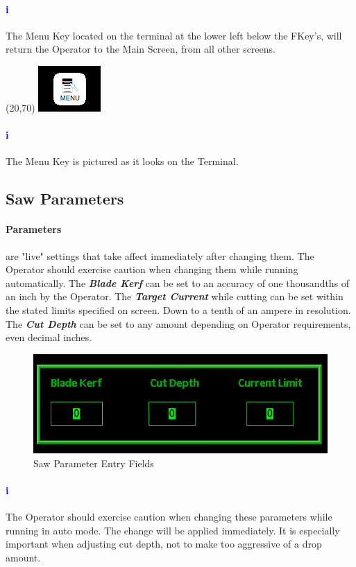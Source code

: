 \paragraph{\textbf{\LARGE \textcolor{blue}{i}}}
The Menu Key located on the terminal at the lower left below the FKey's, will return the Operator to the Main Screen, from all other screens.\\
\begin{minipage}{4cm}
	\begin{picture}(20,70)
		\includegraphics[width=.5\linewidth]{screen-captures/menu}
	\end{picture}
\end{minipage}\begin{minipage}[]{11cm}
	\paragraph{\textbf{\LARGE \textcolor{blue}{i}}} The Menu Key is pictured as it looks on the Terminal.
\end{minipage}
\pagebreak
\subsection{Saw Parameters}\paragraph*{Parameters}are "live" settings that take affect immediately after changing them. The Operator should exercise caution when changing them while running automatically. The \textbf{\textit{Blade Kerf}} can be set to an accuracy of one thousandths of an inch by the Operator. The \textbf{\textit{Target Current}} while cutting can be set within the stated limits specified on screen. Down to a tenth of an ampere in resolution. The \textbf{\textit{Cut Depth}} can be set to any amount depending on Operator requirements, even decimal inches.
\begin{figure}
	\centering
	\includegraphics[width=.2\linewidth]{screen-captures/program/pgm-saw-info-entry}
	\caption{Saw Parameter Entry Fields}
	\label{fig:pgm-saw-info-entry}
\end{figure}
\paragraph{\textbf{\LARGE \textcolor{blue}{i}}}The Operator should exercise caution when changing these parameters while running in auto mode. The change will be applied immediately. It is especially important when adjusting cut depth, not to make too aggressive of a drop amount.
